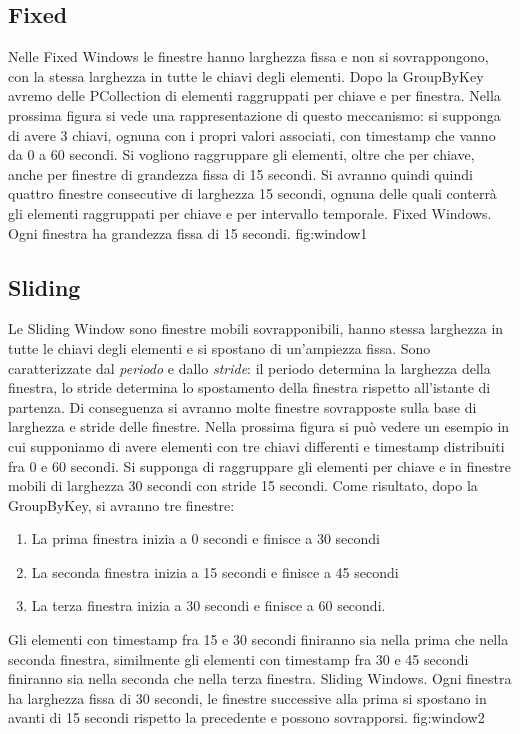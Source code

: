 \subsection{Fixed}
Nelle Fixed Windows le finestre hanno larghezza fissa e non si sovrappongono, con la stessa larghezza in tutte le chiavi degli elementi. Dopo la GroupByKey avremo delle PCollection di elementi raggruppati per chiave e per finestra. Nella prossima figura si vede una rappresentazione di questo meccanismo: si supponga di avere 3 chiavi, ognuna con i propri valori associati, con timestamp che vanno da 0 a 60 secondi. Si vogliono raggruppare gli elementi, oltre che per chiave, anche per finestre di grandezza fissa di 15 secondi. Si avranno quindi quindi quattro finestre consecutive di larghezza 15 secondi, ognuna delle quali conterrà gli elementi raggruppati per chiave e per intervallo temporale.
{Fixed Windows. Ogni finestra ha grandezza fissa di 15 secondi. } 
{fig:window1}
\subsection{Sliding}
Le Sliding Window sono finestre mobili sovrapponibili, hanno stessa larghezza in tutte le chiavi degli elementi e si spostano di un'ampiezza fissa. Sono caratterizzate dal \textit{periodo} e dallo \textit{stride}: il periodo determina la larghezza della finestra, lo stride determina lo spostamento della finestra rispetto all’istante di partenza. Di conseguenza si avranno molte finestre sovrapposte sulla base di larghezza e stride delle finestre. Nella prossima figura si può vedere un esempio in cui supponiamo di avere elementi con tre chiavi differenti e timestamp distribuiti fra 0 e 60 secondi. Si supponga di raggruppare gli elementi per chiave e in finestre mobili di larghezza 30 secondi con stride 15 secondi. Come risultato, dopo la GroupByKey, si avranno tre finestre:
\begin{enumerate}
\item La prima finestra inizia a 0 secondi e finisce a 30 secondi
\item La seconda finestra inizia a 15 secondi e finisce a 45 secondi
\item La terza finestra inizia a 30 secondi e finisce a 60 secondi.
\end{enumerate}
Gli elementi con timestamp fra 15 e 30 secondi finiranno sia nella prima che nella seconda finestra, similmente gli elementi con timestamp fra 30 e 45 secondi finiranno sia nella seconda che nella terza finestra.
{Sliding Windows. Ogni finestra ha larghezza fissa di 30 secondi, le finestre successive alla prima si spostano in avanti di 15 secondi rispetto la precedente e possono sovrapporsi.} 
{fig:window2}
